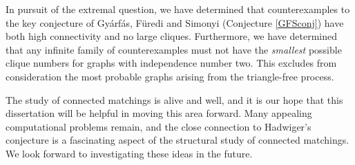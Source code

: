 In pursuit of the extremal question, we have determined that counterexamples to the key conjecture of Gy\'arf\'as, F\"uredi and Simonyi (Conjecture \ref{GFSconj}) have both high connectivity and no large cliques.  Furthermore, we have determined that any infinite family of counterexamples must not have the {\it smallest} possible clique numbers for graphs with independence number two.  This excludes from consideration the most probable graphs arising from the triangle-free process.  

The study of connected matchings is alive and well, and it is our hope that this dissertation will be helpful in moving this area forward.  Many appealing computational problems remain, and the close connection to Hadwiger's conjecture is a fascinating aspect of the structural study of connected matchings.    We look forward to investigating these ideas in the future.  


